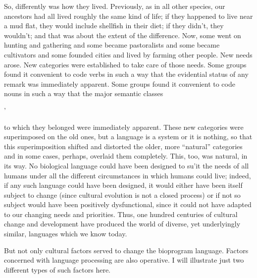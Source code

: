 So, differently was how they lived. Previously, as in all other species, our ancestors had all lived roughly the same kind of life; if they happened to live near a mud flat, they would include shellfish in their diet; if they didn't, they wouldn't; and that was about the extent of the difference. Now, some went on hunting and gathering and some became pastoralists and some became cultivators and some founded cities and lived by farming other people. New needs arose. New cate\-gories were established to take care of those needs. Some groups found it convenient to code verbs in such a way that the evidential status of any remark was immediately apparent. Some groups found it con\-venient to code nouns in such a way that the major semantic classes

'


to which they belonged were immediately apparent. These new cate\-gories were superimposed on the old ones, but a language is a system or it is nothing, so that this superimposition shifted and distorted the older, more ``natural'' categories and in some cases, perhaps, overlaid them completely. This, too, was natural, in its way. No biological language could have been designed to su'it the needs of all humans under all the different circumstances in which humans could live; indeed, if any such language could have been designed, it would either have been itself subject to change (since cultural evolution is not a closed process) or if not so subject would have been positively dys\-functional, since it could not have adapted to our changing needs and priorities. Thus, one hundred centuries of cultural change and develop\-ment have produced the world of diverse, yet underlyingly similar, languages which we know today.

But not only cultural factors served to change the bioprogram language. Factors concerned with language processing are also opera\-tive. I will illustrate just two different types of such factors here.

